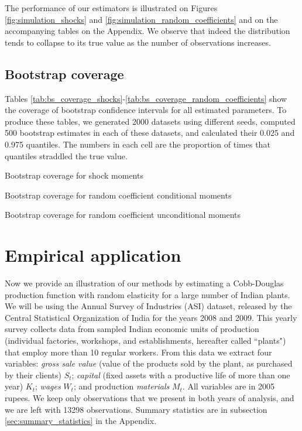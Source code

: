 The performance of our estimators is illustrated on Figures \ref{fig:simulation_shocks} and \ref{fig:simulation_random_coefficients} and on the accompanying tables on the Appendix. We observe that indeed the distribution tends to collapse to its true value as the number of observations increases. 


\subsection{Bootstrap coverage}

Tables \ref{tab:bs_coverage_shocks}-\ref{tab:bs_coverage_random_coefficients} show the coverage of bootstrap confidence intervals for all estimated parameters. To produce these tables, we generated 2000 datasets using different seeds, computed 500 bootstrap estimates in each of these datasets, and calculated their 0.025 and 0.975 quantiles. The numbers in each cell are the proportion of times that quantiles straddled the true value.

\begin{table}[H]
  \singlespacing
  \caption{Bootstrap coverage for shock moments}
  
  \label{tab:bs_coverage_shocks}
\end{table}

\begin{table}[H]
  \singlespacing
  \caption{Bootstrap coverage for random coefficient conditional moments}
  
  \label{tab:bs_conditional_coverage}
\end{table}

\begin{table}[H]
  \singlespacing
  \caption{Bootstrap coverage for random coefficient unconditional moments}
  
  \label{tab:bs_coverage_random_coefficients}
\end{table}

\section{Empirical application}

Now we provide an illustration of our methods by estimating a Cobb-Douglas production function with random elasticity for a large number of Indian plants. We will be using the Annual Survey of Industries (ASI) dataset, released by the Central Statistical Organization of India for the years 2008 and 2009. This yearly survey collects data from sampled Indian economic units of production (individual factories, workshops, and establishments, hereafter called ``plants") that employ more than 10 regular workers. From this data we extract four variables: \emph{gross sale value} (value of the products sold by the plant, as purchased by their clients) $S_{t}$; \emph{capital} (fixed assets with a productive life of more than one year) $K_{t}$; \emph{wages} $W_{t}$; and production \emph{materials} $M_{t}$. All variables are in 2005 rupees. We keep only observations that we present in both years of analysis, and we are left with 13298 observations. Summary statistics are in subsection \ref{sec:summary_statistics} in the Appendix.


